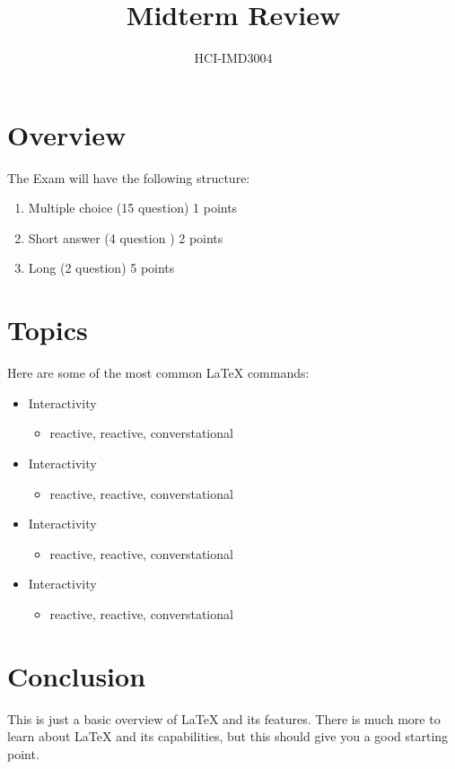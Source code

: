 \documentclass{article}
\begin{document}
\title{Midterm Review}
\author{HCI-IMD3004}
\maketitle




\section*{Overview}
The Exam will have the following structure:
\begin{enumerate}
\item Multiple choice (15 question) 1 points
\item Short answer (4 question ) 2 points
\item Long (2 question) 5 points
\end{enumerate}

\section{Topics}
Here are some of the most common LaTeX commands:
\begin{itemize}
\item Interactivity 
\begin{itemize}
    \item reactive, reactive, converstational
\end{itemize}

\end{itemize}
\begin{itemize}
\item Interactivity 
\begin{itemize}
    \item reactive, reactive, converstational
\end{itemize}

\end{itemize}
\begin{itemize}
\item Interactivity 
\begin{itemize}
    \item reactive, reactive, converstational
\end{itemize}

\end{itemize}
\begin{itemize}
\item Interactivity 
\begin{itemize}
    \item reactive, reactive, converstational
\end{itemize}

\end{itemize}

\section{Conclusion}
This is just a basic overview of LaTeX and its features. There is much more to learn about LaTeX and its capabilities, but this should give you a good starting point.
\end{document}
